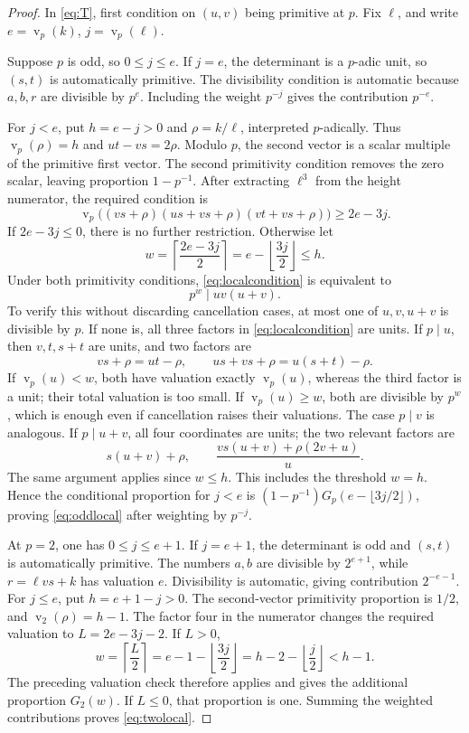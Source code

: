 \documentclass[11pt,a4paper]{article}
\numberwithin{equation}{section}
\theoremstyle{remark}
\newcommand{\vp}{\operatorname{v}}
\begin{document}
\begin{proof}
In \eqref{eq:T}, first condition on $(u,v)$ being primitive at $p$. Fix $\ell$, and write $e=\vp_p(k)$, $j=\vp_p(\ell)$.

Suppose $p$ is odd, so $0\le j\le e$. If $j=e$, the determinant is a $p$-adic unit, so $(s,t)$ is automatically primitive. The divisibility condition is automatic because $a,b,r$ are divisible by $p^e$. Including the weight $p^{-j}$ gives the contribution $p^{-e}$.

For $j<e$, put $h=e-j>0$ and $\rho=k/\ell$, interpreted $p$-adically. Thus $\vp_p(\rho)=h$ and $ut-vs=2\rho$. Modulo $p$, the second vector is a scalar multiple of the primitive first vector. The second primitivity condition removes the zero scalar, leaving proportion $1-p^{-1}$. After extracting $\ell^3$ from the height numerator, the required condition is
\begin{equation}\label{eq:localcondition}
\vp_p\bigl((vs+\rho)(us+vs+\rho)(vt+vs+\rho)\bigr)\ge2e-3j.
\end{equation}
If $2e-3j\le0$, there is no further restriction. Otherwise let
\[
w=\left\lceil\frac{2e-3j}{2}\right\rceil=e-\left\lfloor\frac{3j}{2}\right\rfloor\le h.
\]
Under both primitivity conditions, \eqref{eq:localcondition} is equivalent to
\begin{equation}\label{eq:localcriterion}
p^w\mid uv(u+v).
\end{equation}
To verify this without discarding cancellation cases, at most one of $u,v,u+v$ is divisible by $p$. If none is, all three factors in \eqref{eq:localcondition} are units. If $p\mid u$, then $v,t,s+t$ are units, and two factors are
\[
vs+\rho=ut-\rho,\qquad us+vs+\rho=u(s+t)-\rho.
\]
If $\vp_p(u)<w$, both have valuation exactly $\vp_p(u)$, whereas the third factor is a unit; their total valuation is too small. If $\vp_p(u)\ge w$, both are divisible by $p^w$, which is enough even if cancellation raises their valuations. The case $p\mid v$ is analogous. If $p\mid u+v$, all four coordinates are units; the two relevant factors are
\[
s(u+v)+\rho,\qquad \frac{vs(u+v)+\rho(2v+u)}{u}.
\]
The same argument applies since $w\le h$. This includes the threshold $w=h$. Hence the conditional proportion for $j<e$ is $(1-p^{-1})G_p(e-\lfloor3j/2\rfloor)$, proving \eqref{eq:oddlocal} after weighting by $p^{-j}$.

At $p=2$, one has $0\le j\le e+1$. If $j=e+1$, the determinant is odd and $(s,t)$ is automatically primitive. The numbers $a,b$ are divisible by $2^{e+1}$, while $r=\ell vs+k$ has valuation $e$. Divisibility is automatic, giving contribution $2^{-e-1}$.
For $j\le e$, put $h=e+1-j>0$. The second-vector primitivity proportion is $1/2$, and $\vp_2(\rho)=h-1$. The factor four in the numerator changes the required valuation to $L=2e-3j-2$. If $L>0$,
\[
w=\left\lceil\frac L2\right\rceil=e-1-\left\lfloor\frac{3j}{2}\right\rfloor
=h-2-\left\lfloor\frac j2\right\rfloor<h-1.
\]
The preceding valuation check therefore applies and gives the additional proportion $G_2(w)$. If $L\le0$, that proportion is one. Summing the weighted contributions proves \eqref{eq:twolocal}.


\end{proof}
\end{document}
